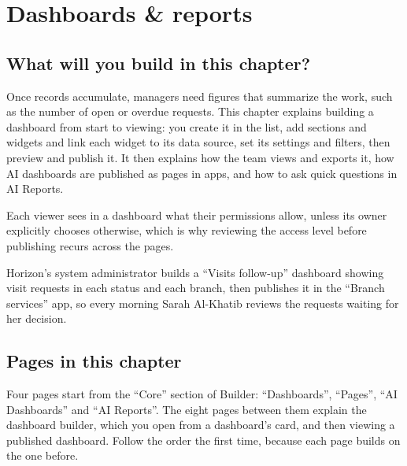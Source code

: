 \chapter{Dashboards \& reports}
\label{ch:builder-dashboards}

\section{What will you build in this chapter?}
\label{sec:builder-dashboards-intro}

Once records accumulate, managers need figures that summarize the work, such as the number of open or overdue requests. This chapter explains building a dashboard from start to viewing: you create it in the list, add sections and widgets and link each widget to its data source, set its settings and filters, then preview and publish it. It then explains how the team views and exports it, how AI dashboards are published as pages in apps, and how to ask quick questions in AI Reports.

Each viewer sees in a dashboard what their permissions allow, unless its owner explicitly chooses otherwise, which is why reviewing the access level before publishing recurs across the pages.

\begin{rcnote}
Horizon's system administrator builds a “Visits follow-up” dashboard showing visit requests in each status and each branch, then publishes it in the “Branch services” app, so every morning Sarah Al-Khatib reviews the requests waiting for her decision.
\end{rcnote}

\section{Pages in this chapter}
\label{sec:builder-dashboards-pages}

Four pages start from the “Core” section of Builder: “Dashboards”, “Pages”, “AI Dashboards” and “AI Reports”. The eight pages between them explain the dashboard builder, which you open from a dashboard's card, and then viewing a published dashboard. Follow the order the first time, because each page builds on the one before.

